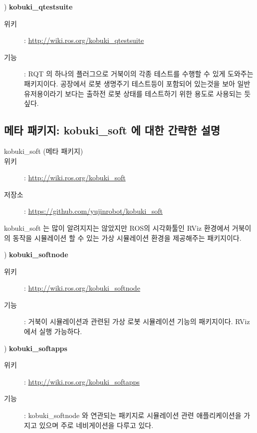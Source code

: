 \vspace{\baselineskip}
\noindent{}
\thenum) \textbf{kobuki\_qtestsuite}
\begin{description}
\item[위키]: \url{http://wiki.ros.org/kobuki_qtestsuite}
\item[기능]: RQT 의 하나의 플러그으로 거북이의 각종 테스트를 수행할 수 있게 도와주는 패키지이다. 공장에서 로봇 생명주기 테스트등이 포함되어 있는것을 보아 일반 유저용이라기 보다는 출하전 로봇 상태를 테스트하기 위한 용도로 사용되는 듯 싶다.
\end{description}

\subsection{메타 패키지: kobuki\_soft 에 대한 간략한 설명}

\vspace{\baselineskip}
\begin{description}
\item[kobuki\_soft (메타 패키지)]
\item[위키]: \url{http://wiki.ros.org/kobuki_soft}
\item[저장소]: \url{https://github.com/yujinrobot/kobuki_soft}
\end{description}

\vspace{\baselineskip}
\noindent
kobuki\_soft 는 많이 알려지지는 않았지만 ROS의 시각화툴인 RViz 환경에서 거북이의 동작을 시뮬레이션 할 수 있는 가상 시뮬레이션 환경을 제공해주는 패키지이다.

\setcounter{num}{0}

\vspace{\baselineskip}
\noindent{}
\thenum) \textbf{kobuki\_softnode}
\begin{description}
\item[위키]: \url{http://wiki.ros.org/kobuki_softnode}
\item[기능]: 거북이 시뮬레이션과 관련된 가상 로봇 시뮬레이션 기능의 패키지이다. RViz 에서 실행 가능하다.
\end{description}

\vspace{\baselineskip}
\noindent{}
\thenum) \textbf{kobuki\_softapps}
\begin{description}
\item[위키]: \url{http://wiki.ros.org/kobuki_softapps}
\item[기능]: kobuki\_softnode 와 연관되는 패키지로 시뮬레이션 관련 애플리케이션을 가지고 있으며 주로 네비게이션을 다루고 있다.
\end{description}

